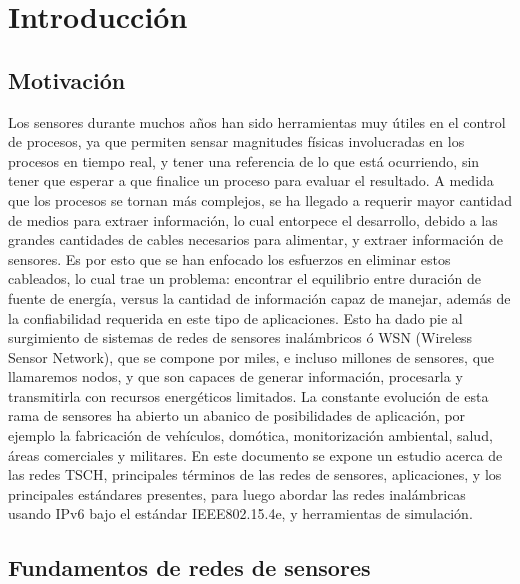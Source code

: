 \chapter[Introducción]{Introducción}
\label{ch:intro}

\section{Motivación}
Los sensores durante muchos años han sido herramientas muy útiles en el control de procesos, ya que permiten sensar magnitudes físicas involucradas en los procesos en tiempo real, y tener una referencia de lo que está ocurriendo, sin tener que esperar a que finalice un proceso para evaluar el resultado.
A medida que los procesos se tornan más complejos, se ha llegado a requerir mayor cantidad de medios para extraer información, lo cual entorpece el desarrollo, debido a las grandes cantidades de cables necesarios para alimentar, y extraer información de sensores. Es por esto que se han enfocado los esfuerzos en eliminar estos cableados, lo cual trae un problema: encontrar el equilibrio entre duración de fuente de energía, versus la cantidad de información capaz de manejar, además de la confiabilidad requerida en este tipo de aplicaciones. Esto ha dado pie al surgimiento de sistemas de redes de sensores inalámbricos ó WSN (Wireless Sensor Network), que se compone por miles, e incluso millones de sensores, que llamaremos nodos, y que son capaces de generar información, procesarla y transmitirla con recursos energéticos limitados.
La constante evolución de esta rama de sensores ha abierto un abanico de posibilidades de aplicación, por ejemplo la fabricación de vehículos, domótica, monitorización ambiental, salud, áreas comerciales y militares. \cite{dujovne20146tisch}
En este documento se expone un estudio acerca de las redes TSCH, principales términos de las redes de sensores, aplicaciones, y los principales estándares presentes, para luego abordar las redes inalámbricas usando IPv6 bajo el estándar IEEE802.15.4e, y herramientas de simulación.

\section{Fundamentos de redes de sensores}

